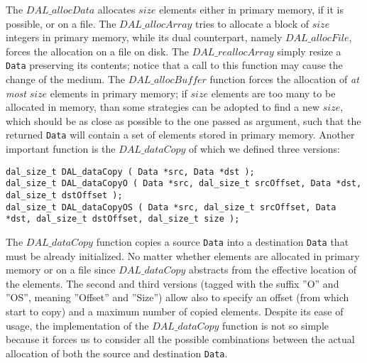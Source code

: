 The $DAL\_allocData$ allocates $size$ elements either in primary memory, if it is possible, or on a file. The $DAL\_allocArray$ tries to allocate a block of $size$ integers in primary memory, while its dual counterpart, namely $DAL\_allocFile$, forces the allocation on a file on disk. The $DAL\_reallocArray$ simply resize a \texttt{Data} preserving its contents; notice that a call to this function may cause the change of the medium. The $DAL\_allocBuffer$ function forces the allocation of \textit{at most} $size$ elements in primary memory; if $size$ elements are too many to be allocated in memory, than some strategies can be adopted to find a new $size$, which should be as close as possible to the one passed as argument, such that the returned \texttt{Data} will contain a set of elements stored in primary memory.
Another important function is the $DAL\_dataCopy$ of which we defined three versions:
\begin{lstlisting}
dal_size_t DAL_dataCopy ( Data *src, Data *dst ); 
dal_size_t DAL_dataCopyO ( Data *src, dal_size_t srcOffset, Data *dst, dal_size_t dstOffset ); 
dal_size_t DAL_dataCopyOS ( Data *src, dal_size_t srcOffset, Data *dst, dal_size_t dstOffset, dal_size_t size );
\end{lstlisting}
The $DAL\_dataCopy$ function copies a source \texttt{Data} into a destination \texttt{Data} that must be already initialized. No matter whether elements are allocated in primary memory or on a file since $DAL\_dataCopy$ abstracts from the effective location of the elements. The second and third versions (tagged with the suffix ''O'' and ''OS'', meaning ''Offset'' and ''Size'') allow also to specify an offset (from which start to copy) and a maximum number of copied elements. Despite its ease of usage, the implementation of  the $DAL\_dataCopy$ function is not so simple because it forces us to consider all the possible combinations between the actual allocation of both the source and destination \texttt{Data}. 

